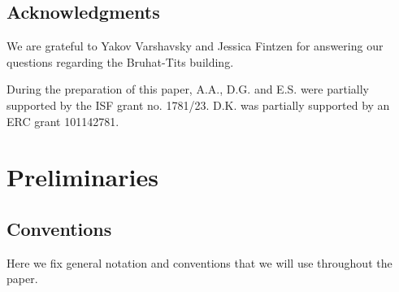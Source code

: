 \documentclass[12pt,a4paper]{amsart}%
\newcommand{\RamiA}[1]{{{#1}}}
\newcommand{\EitanE}[1]{{{#1}}}
\begin{document}
\subsection{Acknowledgments}
\RamiA{We are grateful to  \EitanE{Yakov} Varshavsky and Jessica Fintzen for answering our questions regarding the Bruhat-Tits building.}

During the preparation of this paper, A.A., D.G. and E.S. were partially supported by the ISF grant no. 1781/23. 
D.K. was partially supported by an ERC grant 101142781.


\section{Preliminaries}\label{sec:prelim}
\subsection{Conventions}
Here we fix general notation and conventions that we will use throughout the paper.
\end{document}
